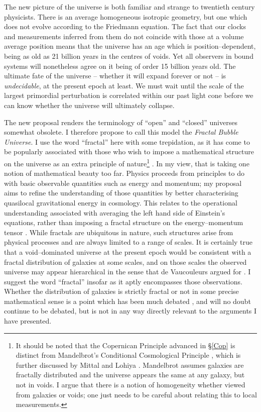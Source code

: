 \documentclass[12pt]{article}
\begin{document}
The new picture of the universe is both familiar and strange to twentieth
century physicists. There is an average homogeneous isotropic geometry, but
one which does not evolve according to the Friedmann equation. The fact that
our clocks and measurements inferred from them do not coincide with those
at a volume average position means that the universe has an age which is
position--dependent, being as old as 21 billion years in the centres of voids.
Yet all observers in bound systems will nonetheless agree on it being of
order 15 billion years old. The ultimate fate of the universe -- whether it
will expand forever or not -- is {\em undecidable}, at the present epoch
at least. We must wait until the scale of the largest primordial
perturbation is correlated within our past light cone before we can know
whether the universe will ultimately collapse.

The new proposal renders the terminology of ``open'' and ``closed''
universes somewhat obsolete. I therefore propose to call this model
the {\em Fractal Bubble Universe}. I use the word ``fractal'' here
with some trepidation, as it has come to be popularly associated with
those who wish to impose a mathematical structure on the universe as an
extra principle of nature\footnote{It should be noted that the Copernican
Principle advanced in \S\ref{Cop} is distinct from Mandelbrot's Conditional
Cosmological Principle \cite{Mandel}, which is further discussed by Mittal
and Lohiya \cite{ML}. Mandelbrot assumes galaxies are fractally distributed
and the universe appears the same at any galaxy, but not in voids. I argue
that there is a notion of homogeneity whether viewed from galaxies or voids;
one just needs to be careful about relating this to local measurements.}
\cite{Mandel}. In my view, that is taking one
notion of mathematical beauty too far. Physics proceeds from principles to
do with basic observable quantities such as energy and momentum; my proposal
aims to refine the understanding of those quantities by better characterising
quasilocal gravitational energy in cosmology. This relates to the operational
understanding associated with averaging the left hand side of Einstein's
equations, rather than imposing a fractal structure on the energy--momentum
tensor \cite{ML}. While fractals are
ubiquitous in nature, such structures arise from physical processes and
are always limited to a range of scales.
It is certainly true that a void--dominated universe at the present epoch
would be consistent with a fractal distribution of galaxies at some scales,
and on those scales the observed universe may appear hierarchical in the sense
that de Vaucouleurs argued for \cite{deVau}. I suggest the word ``fractal''
insofar as it aptly encompasses those observations. Whether the distribution
of galaxies is strictly fractal or not in some precise mathematical sense
is a point which has been much debated \cite{paradox1,fractals}, and will
no doubt continue to be debated, but is not in any way directly relevant to the
arguments I have presented.
\end{document}
